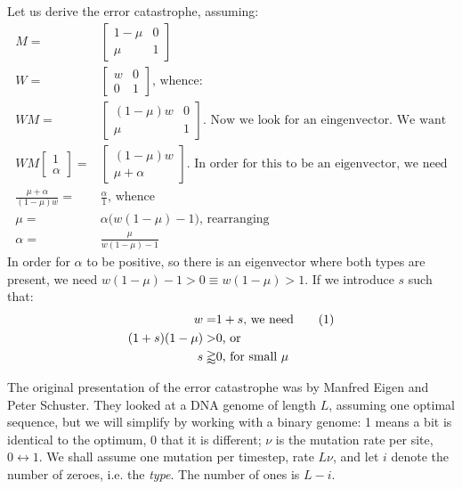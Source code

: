 \documentclass[]{article}
\newcommand\numberthis{\addtocounter{equation}{1}\tag{\theequation}}
\begin{document}
Let us derive the error catastrophe, assuming:
\begin{align*}
	M =& \begin{bmatrix}
		1-\mu&0\\
		\mu&1
	\end{bmatrix}\\
	W=& \begin{bmatrix}
		w&0\\
		0&1
	\end{bmatrix} \text{, whence:}\\
	WM =& \begin{bmatrix}
		(1-\mu)w&0\\
		\mu&1
	\end{bmatrix} \text{. Now we look for an eingenvector. We want}\\
	WM\begin{bmatrix}
		1\\
		\alpha
	\end{bmatrix}=&\begin{bmatrix}
				(1-\mu)w\\
				\mu+\alpha
			\end{bmatrix} \text{. In order for this to be an eigenvector, we need}\\
	\frac{\mu+\alpha}{(1-\mu)w} =& \frac{\alpha}{1} \text{, whence}\\
	\mu =& \alpha \big(w(1-\mu)-1\big) \text{, rearranging}\\
	\alpha =& \frac{\mu}{w(1-\mu)-1}
\end{align*}
In order for $\alpha$ to be positive, so there is an eigenvector where both types are present, we need $w(1-\mu)-1>0 \equiv w(1-\mu)>1$. If we introduce $s$ such that:
\begin{align*}
	w =& 1+s \text{, we need} \numberthis \label{eq:s:w}\\
	(1+s)(1-\mu) >& 0 \text{, or}\\
	s \gtrapprox& 0 \text{, for small $\mu$}
\end{align*}

The original presentation of the error catastrophe was by Manfred Eigen and Peter Schuster. They looked at a DNA genome of length $L$, assuming one optimal sequence, but we will simplify by working with a binary genome: 1 means a bit is identical to the optimum, 0 that it is different; $\nu$ is the mutation rate per site, $0\leftrightarrow1$. We shall assume one mutation per timestep, rate $L\nu$, and let $i$ denote the number of zeroes, i.e. the \emph{type}. The number of ones is $L-i$.
\end{document}
